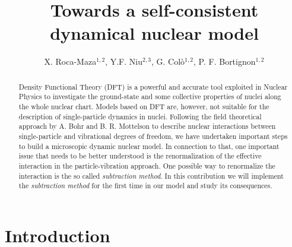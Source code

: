 \documentclass[12pt,a4paper,final]{iopart}
\begin{document}
\title{Towards a self-consistent dynamical nuclear model}

\author{X. Roca-Maza$^{1,2}$, Y.F. Niu$^{2,3}$, G. Col\`o$^{1,2}$, P. F. Bortignon$^{1,2}$}

\address{$^{1}$Dipartimento di Fisica, Universit\`a degli Studi di Milano, Via Celoria 16, I-20133 Milano, Italy\\ 
$^2$INFN, Sezione di Milano, Via Celoria 16, I-20133 Milano, Italy\\
$^3$ELI-NP, Horia Hulubei National Institute for Physics and Nuclear Engineering,
30 Reactorului Street, RO-077125, Bucharest-Magurele, Romania}


\begin{abstract}
Density Functional Theory (DFT) is a powerful and accurate tool exploited in Nuclear Physics to investigate the ground-state and some collective properties of nuclei along the whole nuclear chart. Models based on DFT are, however, not suitable for the description of single-particle dynamics in nuclei. Following the field theoretical approach by A. Bohr and B. R. Mottelson to describe nuclear interactions between single-particle and vibrational degrees of freedom, we have undertaken important steps to build a microscopic dynamic nuclear model. In connection to that, one important issue that needs to be better understood is the renormalization of the effective interaction in the particle-vibration approach. One possible way to renormalize the interaction is the so called {\it subtraction method}. In this contribution we will implement the {\it subtraction method} for the first time in our model and study its consequences. 
\end{abstract}

 

\maketitle
\section{Introduction}
\label{intro}
\end{document}

